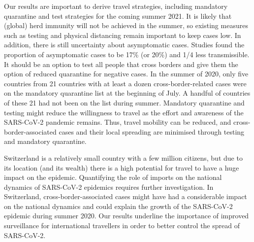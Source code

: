 \documentclass[10pt, a4paper, twoside]{article}
\begin{document}
\begin{multicols}{2}
Our results are important to derive travel strategies, including mandatory quarantine and test strategies for the coming summer 2021.
It is likely that (global) herd immunity will not be achieved in the summer, so existing measures such as testing and physical distancing remain important to keep cases low.
In addition, there is still uncertainty about asymptomatic cases.\cite{nogrady_what_2020}
Studies found the proportion of asymptomatic cases to be 17\% (or 20\%) and 1/4 less transmissible.\cite{byambasuren_estimating_2020,buitrago-garcia_occurrence_2020,bi_household_2020}
It should be an option to test all people that cross borders and give them the option of reduced quarantine for negative cases.\cite{ashcroft_quantifying_2021}
In the summer of 2020, only five countries from 21 countries with at least a dozen cross-border-related cases were on the mandatory quarantine list at the beginning of July.
A handful of countries of these 21 had not been on the list during summer.
Mandatory quarantine and testing might reduce the willingness to travel as the effort and awareness of the SARS-CoV-2 pandemic remains.
Thus, travel mobility can be reduced, and cross-border-associated cases and their local spreading are minimised through testing and mandatory quarantine.

Switzerland is a relatively small country with a few million citizens, but due to its location (and its wealth) there is a high potential for travel to have a huge impact on the epidemic.
Quantifying the role of imports on the national dynamics of SARS-CoV-2 epidemics requires further investigation. 
In Switzerland, cross-border-associated cases might have had a considerable impact on the national dynamics and could explain the growth of the SARS-CoV-2 epidemic during summer 2020. 
Our results underline the importance of improved surveillance for international travellers in order to better control the spread of SARS-CoV-2.


\end{multicols}
\end{document}
